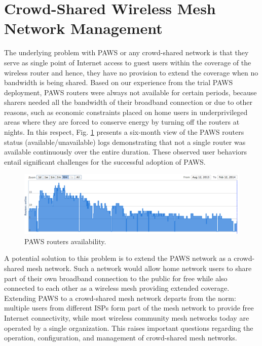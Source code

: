 \section{Crowd-Shared Wireless Mesh Network Management}
\label{sec:architecture}

The underlying problem with PAWS or any crowd-shared network is that they serve as single point of Internet access to guest users within the coverage of the wireless router and hence, they have no provision to extend the coverage when no bandwidth is being shared. Based on our experience from the trial PAWS deployment, PAWS routers were always not available for certain periods, because sharers needed all the bandwidth of their broadband connection or due to other reasons, such as economic constraints placed on home users in underprivileged areas where they are forced to conserve energy by turning off the routers at nights. In this respect, Fig. \ref{fig:paws-avail} presents a six-month view of the PAWS routers status (available/unavailable) logs demonstrating that not a single router was available continuously over the entire duration. These observed user behaviors entail significant challenges for the successful adoption of PAWS. 

\begin{figure}[t]
\begin{center}
\includegraphics[width=1\linewidth]{paws-avail.pdf}  
\caption{PAWS routers availability.}
\label{fig:paws-avail}
\end{center}
\end{figure}

A potential solution to this problem is to extend the PAWS network as a crowd-shared mesh network. Such a network would allow home network users to share part of their own broadband connection to the public for free while also connected to each other as a wireless mesh providing extended coverage. Extending PAWS to a crowd-shared mesh network departs from the norm: multiple users from different ISPs form part of the mesh network to provide free Internet connectivity, while most wireless community mesh networks today are operated by a single organization. This raises important questions regarding the operation, configuration, and management of crowd-shared mesh networks.  

